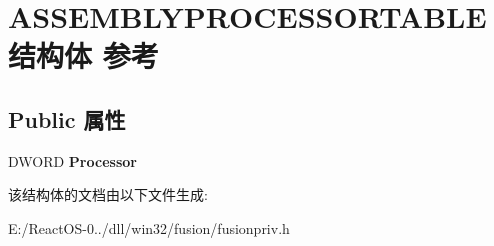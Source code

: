 \hypertarget{struct_a_s_s_e_m_b_l_y_p_r_o_c_e_s_s_o_r_t_a_b_l_e}{}\section{A\+S\+S\+E\+M\+B\+L\+Y\+P\+R\+O\+C\+E\+S\+S\+O\+R\+T\+A\+B\+L\+E结构体 参考}
\label{struct_a_s_s_e_m_b_l_y_p_r_o_c_e_s_s_o_r_t_a_b_l_e}
\subsection*{Public 属性}
\begin{DoxyCompactItemize}
\item 
\mbox{\label{struct_a_s_s_e_m_b_l_y_p_r_o_c_e_s_s_o_r_t_a_b_l_e_abf0289aff47c484581ff5a6b779683cc}} 
D\+W\+O\+RD {\bfseries Processor}
\end{DoxyCompactItemize}


该结构体的文档由以下文件生成\+:\begin{DoxyCompactItemize}
\item 
E\+:/\+React\+O\+S-\/0../dll/win32/fusion/fusionpriv.\+h\end{DoxyCompactItemize}
